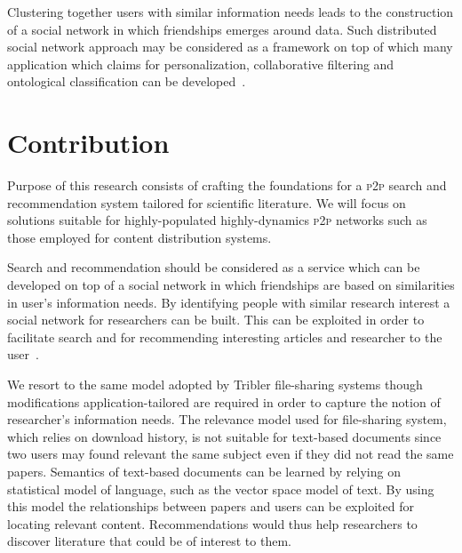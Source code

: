 Clustering together users with similar information needs leads to the construction of a social network in which friendships emerges around data. Such distributed social network approach may be considered as a framework on top of which many application which claims for personalization, collaborative filtering and ontological classification can be developed~\cite{AHP+09}.

\section{\label{sec:intro_contribution}Contribution}
Purpose of this research consists of crafting the foundations for a \textsc{p2p} search and recommendation system tailored for scientific literature. We will focus on solutions suitable for highly-populated highly-dynamics \textsc{p2p} networks such as those employed for content distribution systems.

Search and recommendation should be considered as a service which can be developed on top of a social network in which friendships are based on similarities in user's information needs. By identifying people with similar research interest a social network for researchers can be built. This can be exploited in order to facilitate search and for recommending interesting articles and researcher to the user~\cite{HPK08}.

We resort to the same model adopted by Tribler file-sharing systems though modifications application-tailored are required in order to capture the notion of researcher's information needs. The relevance model used for file-sharing system, which relies on download history, is not suitable for text-based documents since two users may found relevant the same subject even if they did not read the same papers. Semantics of text-based documents can be learned by relying on statistical model of language, such as the vector space model of text. By using this model the relationships between papers and users can be exploited for locating relevant content. Recommendations would thus help researchers to discover literature that could be of interest to them.

